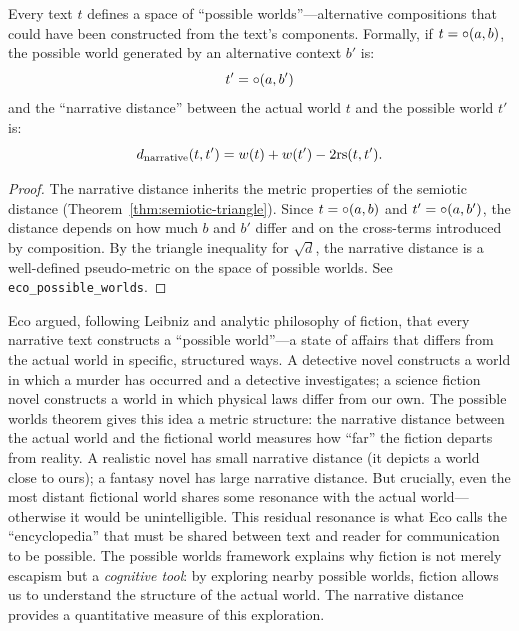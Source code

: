 \begin{theorem}
\label{thm:eco-possible-worlds}
Every text $t$ defines a space of ``possible worlds''---alternative compositions that could have been constructed from the text's components. Formally, if $t = \circ(a, b)$, the possible world generated by an alternative context $b'$ is:
\[
  t' = \circ(a, b')
\]
and the ``narrative distance'' between the actual world $t$ and the possible world $t'$ is:
\[
  d_{\text{narrative}}(t, t') = w(t) + w(t') - 2\mathrm{rs}(t, t').
\]
\end{theorem}

\begin{proof}
The narrative distance inherits the metric properties of the semiotic distance (Theorem~\ref{thm:semiotic-triangle}). Since $t = \circ(a, b)$ and $t' = \circ(a, b')$, the distance depends on how much $b$ and $b'$ differ and on the cross-terms introduced by composition. By the triangle inequality for $\sqrt{d}$, the narrative distance is a well-defined pseudo-metric on the space of possible worlds. See \texttt{eco\_possible\_worlds}.
\end{proof}

\begin{interpretation}
Eco argued, following Leibniz and analytic philosophy of fiction, that every narrative text constructs a ``possible world''---a state of affairs that differs from the actual world in specific, structured ways. A detective novel constructs a world in which a murder has occurred and a detective investigates; a science fiction novel constructs a world in which physical laws differ from our own. The possible worlds theorem gives this idea a metric structure: the narrative distance between the actual world and the fictional world measures how ``far'' the fiction departs from reality. A realistic novel has small narrative distance (it depicts a world close to ours); a fantasy novel has large narrative distance. But crucially, even the most distant fictional world shares some resonance with the actual world---otherwise it would be unintelligible. This residual resonance is what Eco calls the ``encyclopedia'' that must be shared between text and reader for communication to be possible. The possible worlds framework explains why fiction is not merely escapism but a \emph{cognitive tool}: by exploring nearby possible worlds, fiction allows us to understand the structure of the actual world. The narrative distance provides a quantitative measure of this exploration.
\end{interpretation}

